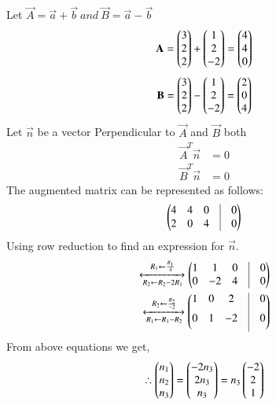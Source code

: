 Let $\vec{A}=\vec{a}+\vec{b} \ and\  \vec{B}=\vec{a}-\vec{b}$
\begin{align}
\mathbf{A} = \begin{pmatrix}3\\2\\2\\\end{pmatrix} + \begin{pmatrix}1\\2\\-2\\\end{pmatrix} = \begin{pmatrix}4\\4\\0\\\end{pmatrix}
\end{align}
\begin{align}
\mathbf{B} = \begin{pmatrix}3\\2\\2\\\end{pmatrix} - \begin{pmatrix}1\\2\\-2\\\end{pmatrix}=\begin{pmatrix}2\\0\\4\\\end{pmatrix}
\end{align}
Let $\vec{n}$ be a vector Perpendicular to $\vec{A}$ and $\vec{B}$ both
	\begin{align}
		\vec{A}^{T}\vec{n} &= 0 \\
		\vec{B}^{T}\vec{n} &= 0
	\end{align} 
The augmented matrix can be represented as follows:
    \begin{align}
		\myvec{
			4 & 4 & 0 & \vrule & 0 \\
			2 & 0 & 4 & \vrule & 0 \\
		}
	\end{align}
	Using row reduction to find an expression for $\vec{n}$.
	    \begin{align}
		\xleftrightarrow[R_2 \leftarrow R_2-2R_1]{R_1 \leftarrow \frac{R_1}{4}}
		\myvec{
			1 & 1 & 0 & \vrule & 0 \\
			0 & -2 & 4 & \vrule & 0 \\
		}
		\\
		\xleftrightarrow[R_1 \leftarrow R_1-R_2]{R_2 \leftarrow \frac{R_2}{-2}}
		\myvec{
			1 & 0 & 2 & \vrule & 0 \\[0.2cm]
			0 & 1 & -2 & \vrule & 0 \\[0.2cm]
		}
	\end{align}
From above equations we get,
  \begin{align}
\therefore \begin{pmatrix}n_1\\n_2\\n_3\end{pmatrix} = \begin{pmatrix}-2n_3\\2n_3\\n_3\end{pmatrix} = n_3\begin{pmatrix}-2\\2\\1\end{pmatrix}
  \end{align}
